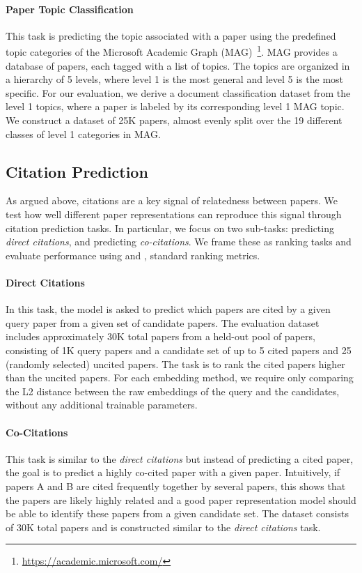 \paragraph{Paper Topic Classification  \hspace{1em}}
This task is predicting the topic associated with a paper using the predefined topic categories of the Microsoft Academic Graph (MAG)~\cite{Sinha2015AnOO}\footnote{\url{https://academic.microsoft.com/}}. MAG provides a database of papers, each tagged with a list of topics. The topics are organized in a hierarchy of 5 levels, where level 1 is the most general and level 5 is the most specific. For our evaluation, we derive a document classification dataset from the level 1 topics, where a paper is labeled by its corresponding level 1 MAG topic.
We construct a dataset of 25K papers, almost evenly split over the 19 different classes of level 1 categories in MAG.


\subsection{Citation Prediction}

As argued above, citations are a key signal of relatedness between papers.  We test how well different paper representations can reproduce this signal through citation prediction tasks. In particular, we focus on two sub-tasks: predicting \textit{direct citations}, and predicting \textit{co-citations}.
We frame these as ranking tasks and evaluate performance using \map and \ndcg, standard ranking metrics. 

\paragraph{Direct Citations} 
In this task, the model is asked to predict which papers are cited by a given query paper from a given set of candidate papers. The evaluation dataset includes approximately 30K total papers from a held-out pool of papers, consisting of 1K query papers and a candidate set of up to 5 cited papers and 25 (randomly selected) uncited papers. The task is to rank the cited papers higher than the uncited papers. For each embedding method, we require only comparing the L2 distance between the raw embeddings of the query and the candidates, without any additional trainable parameters. 

\paragraph{Co-Citations}
This task is similar to the \textit{direct citations} but instead of predicting a cited paper, the goal is to predict a highly co-cited paper with a given paper. Intuitively, if papers A and B are cited frequently together by several papers, this shows that the papers are likely highly related and a good paper representation model should be able to identify these papers from a given candidate set. The dataset consists of 30K total papers and is constructed similar to the \textit{direct citations} task.

